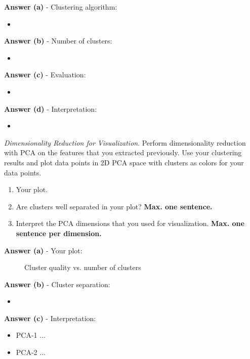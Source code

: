 \documentclass[a4paper,10pt]{article}
\begin{document}
\begin{enumerate}[topsep=0mm, partopsep=0mm, leftmargin=*]
\textbf{Answer (a)} - Clustering algorithm:
\begin{itemize}
	\item 
\end{itemize}

\textbf{Answer (b)} - Number of clusters:
\begin{itemize}
	\item 
\end{itemize}

\textbf{Answer (c)} - Evaluation:
\begin{itemize}
	\item 
\end{itemize}

\textbf{Answer (d)} - Interpretation:
\begin{itemize}
	\item 
\end{itemize}



\clearpage
{\color{blue}
\newpage\item\textit{Dimensionality Reduction for Visualization}. Perform dimensionality reduction with PCA on the features that you extracted previously. Use your clustering results and plot data points in 2D PCA space with clusters as colors for your data points.
\begin{enumerate}
	\item Your plot.
	\item Are clusters well separated in your plot? {\color{red}\textbf{Max. one sentence.}}
	\item Interpret the PCA dimensions that you used for visualization. {\color{red}\textbf{Max. one sentence per dimension.}}
\end{enumerate}
}

\textbf{Answer (a)} - Your plot:
\begin{figure}[H]
	\centering
	\caption{Cluster quality vs. number of clusters}
	\label{fig:example}
\end{figure}

\textbf{Answer (b)} -  Cluster separation:
\begin{itemize}
	\item 
\end{itemize}

\textbf{Answer (c)} - Interpretation:
\begin{itemize}
	\item PCA-1 ...
	\item PCA-2 ...
\end{itemize}



\end{enumerate}
\end{document}
